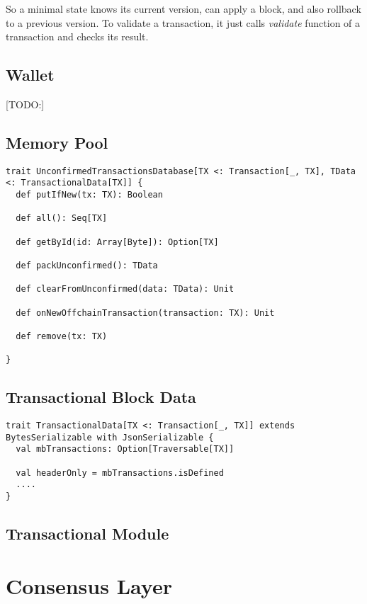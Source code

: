 \documentclass[]{report}   %
\begin{document}
So a minimal state knows its current version, can apply a block, and also rollback to a previous version. To validate a transaction, it just calls \textit{validate} function of a transaction and checks its result.

\subsection{Wallet}

[TODO:]

\subsection{Memory Pool}

\begin{lstlisting}
trait UnconfirmedTransactionsDatabase[TX <: Transaction[_, TX], TData <: TransactionalData[TX]] {
  def putIfNew(tx: TX): Boolean

  def all(): Seq[TX]

  def getById(id: Array[Byte]): Option[TX]

  def packUnconfirmed(): TData

  def clearFromUnconfirmed(data: TData): Unit

  def onNewOffchainTransaction(transaction: TX): Unit

  def remove(tx: TX)
  
}
\end{lstlisting}

\subsection{Transactional Block Data}

\begin{lstlisting}
trait TransactionalData[TX <: Transaction[_, TX]] extends BytesSerializable with JsonSerializable {
  val mbTransactions: Option[Traversable[TX]]

  val headerOnly = mbTransactions.isDefined
  ....
}
\end{lstlisting}

\subsection{Transactional Module}



\section{Consensus Layer}
\end{document}
